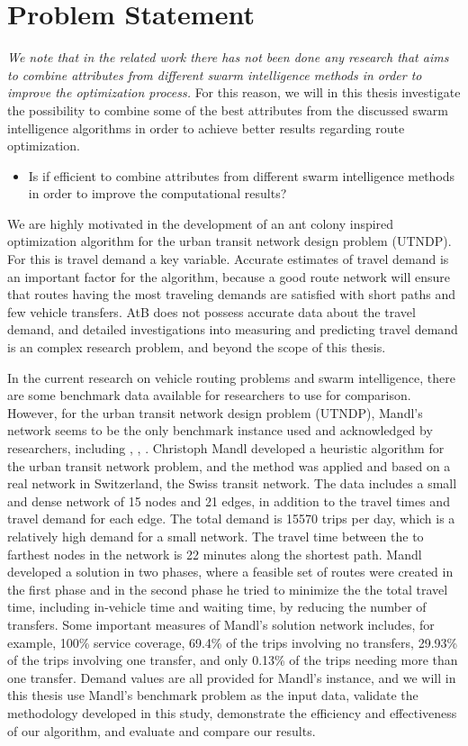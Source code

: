 \section{Problem Statement}
\textit{We note that in the related work there has not been done any research that aims to combine attributes from different swarm intelligence methods in order to improve the optimization process.} For this reason, we will in this thesis investigate the possibility to combine some of the best attributes from the discussed swarm intelligence algorithms in order to achieve better results regarding route optimization. 
\begin{itemize}
\item Is if efficient to combine attributes from different swarm intelligence methods in order to improve the computational results?
\end{itemize}

We are highly motivated in the development of an ant colony inspired optimization algorithm for the urban transit network design problem (UTNDP). For this is travel demand a key variable. Accurate estimates of travel demand is an important factor for the algorithm, because a good route network will ensure that routes having the most traveling demands are satisfied with short paths and few vehicle transfers. AtB does not possess accurate data about the travel demand, and detailed investigations into measuring and predicting travel demand is an complex research problem, and beyond the scope of this thesis. 

In the current research on vehicle routing problems and swarm intelligence, there are some benchmark data available for researchers to use for comparison. However, for the urban transit network design problem (UTNDP), Mandl's network seems to be the only benchmark instance used and acknowledged by researchers, including \citep{fan09}, \citep{kechagiopoulos14}, \citep{nikolic14}. Christoph Mandl \citep{mandl79} developed a heuristic algorithm for the urban transit network problem, and the method was applied and based on a real network in Switzerland, the Swiss transit network\citep{mandl80}. The data includes a small and dense network of 15 nodes and 21 edges, in addition to the travel times and travel demand for each edge. The total demand is 15570 trips per day, which is a relatively high demand for a small network. The travel time between the to farthest nodes in the network is 22 minutes along the shortest path. Mandl developed a solution in two phases, where a feasible set of routes were created in the first phase and in the second phase he tried to minimize the the total travel time, including in-vehicle time and waiting time, by reducing the number of transfers. Some important measures of Mandl's solution network includes, for example, 100\% service coverage, 69.4\% of the trips involving no transfers, 29.93\% of the trips involving one transfer, and only 0.13\% of the trips needing more than one transfer. Demand values are all provided for Mandl's instance, and we will in this thesis use Mandl's benchmark problem \citep{mandl79} as the input data, validate the methodology developed in this study, demonstrate the efficiency and effectiveness of our algorithm, and evaluate and compare our results. 

